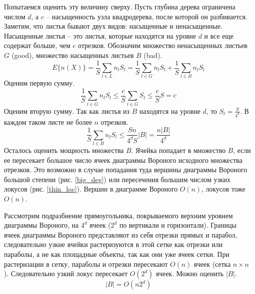 Попытаемся оценить эту величину сверху. Пусть глубина дерева ограничена числом $d$, 
а $c$ -- насыщенность узла квадродерева, после которой он разбивается.
Заметим, что листья бывают двух видов: насыщенные и ненасыщенные. Насыщенные листья -- это
листья, которые находятся на уровне $d$ и все еще содержат больше, чем $c$ отрезков.
Обозначим множество ненасыщенных листьев $G$ (good), множество насыщенных листьев $B$ (bad).
\begin{equation}
E\{n(X)\} = \frac{1}{S}\sum\limits_{l \in L}n_lS_l = 
\label{expectation}
\frac{1}{S}\sum\limits_{l \in G}n_lS_l 
+
\frac{1}{S}\sum\limits_{l \in B}n_lS_l
\end{equation}
Оценим первую сумму.
\begin{equation}
\frac{1}{S}\sum\limits_{l \in G}n_lS_l \le \frac{c}{S}\sum\limits_{l \in G}S_l \le \frac{c}{S}S = c
\label{sum1}
\end{equation}
Оценим вторую сумму. Так как листья из $B$ находятся на уровне $d$, то $S_l = \frac{S}{4^d}$.
В каждом таком листе не более $n$ отрезков.
\begin{equation}
\frac{1}{S}\sum\limits_{l \in B}n_lS_l \le \frac{Sn}{4^dS}|B| = \frac{n|B|}{4^d}
\label{sum2}
\end{equation}
Осталось оценить мощность множества $B$. Ячейка попадает в множество $B$, если ее пересекает
большое число ячеек диаграммы Вороного исходного множества отрезков.
Это возможно в случае попадания туда вершины диаграммы Вороного большой степени (рис. \ref{big_deg})
или пересечения большим числом узких локусов (рис. \ref{thin_loc}). Вершин в диаграмме Вороного
$O(n)$, локусов тоже $O(n)$. 

\FloatBarrier

Рассмотрим подразбиение прямоугольника, покрываемого верхним уровнем 
диаграммы Вороного, на $4^d$ ячеек ($2^d$ по вертикали и горизонтали).
Границы ячеек диаграммы Вороного представляют из себя отрезки прямых и парабол, следовательно
узкие ячейки растеризуются в этой сетке как отрезки или параболы, а не как площадные объекты, 
так как они уже ячеек сетки. При растеризации в сетку, параболы и отрезки пересекают $O(n)$ ячеек (сетка $n \times n$).
Следовательно узкий локус пересекает $O(2^d)$ ячеек. Можно оценить $|B|$.
\begin{equation}
|B| = O(n2^d)
\label{bad_segs}
\end{equation}

